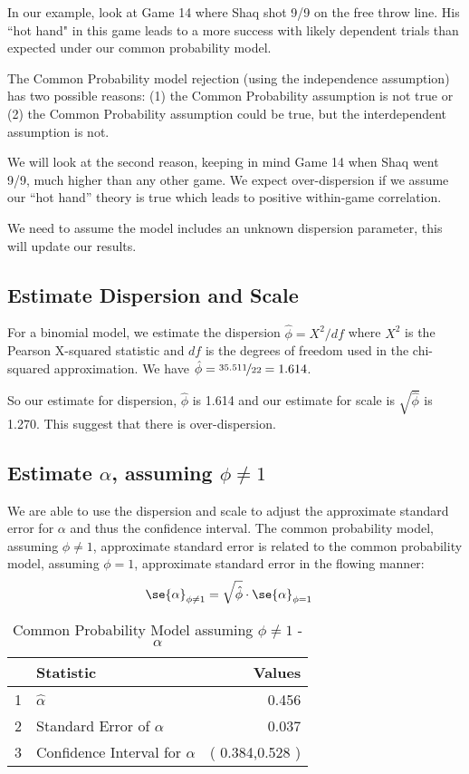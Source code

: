 \documentclass[12pt, letterpaper]{article}
\begin{document}
In our example, look at Game 14 where Shaq shot 9/9 on the free throw line.  His ``hot hand" in this game leads to a more success  with likely dependent trials than expected under our common probability model.  

The Common Probability model rejection (using the independence assumption) has two possible reasons: (1) the Common Probability assumption is not true or (2) the Common Probability assumption could be true, but the interdependent assumption is not. 

We will look at the second reason, keeping in mind Game 14 when Shaq went 9/9, much higher than any other game.  We expect over-dispersion if we assume our ``hot hand'' theory is true which leads to positive within-game correlation.  

We need to assume the model includes an unknown dispersion parameter, this will update our results.    

\subsection{Estimate Dispersion and Scale} 
For a binomial model, we estimate the dispersion $\hat{\phi} = X^2 / df$ where $X^2$ is the Pearson X-squared statistic  and $df$ is the degrees of freedom used in the chi-squared approximation.  We have $\hat{\phi} = \nicefrac{35.511}{22} = 1.614$.  

So our estimate for dispersion, $\hat{\phi}$ is 1.614 and our estimate for scale is $\sqrt{ \hat{\phi}}$ is 1.270.  This suggest that there is over-dispersion.  


\subsection{Estimate $\alpha$, assuming $\phi \neq 1$} 

We are able to use the dispersion and scale to adjust the approximate standard error for $\alpha$ and thus the confidence interval.  The common probability model, assuming $\phi \neq 1$,  approximate standard error is related to the common probability model, assuming $\phi =1$, approximate standard error in the flowing manner:  
\begin{align*}
\se{\alpha}_{\phi \neq 1}  & = \sqrt{\hat{\phi}} \cdot \se{\alpha}_{\phi = 1} 
\end{align*}


\begin{table}[ht]
	\centering
	\caption{Common Probability Model assuming $\phi \neq 1$ - $\alpha$} 
	\begin{tabular}{llr}
		\hline
		& Statistic & Values \\ 
		\hline
		1 & $\hat{\alpha}$ & 0.456 \\ 
		2 & Standard Error of $\alpha$ & 0.037 \\ 
		3 & Confidence Interval for $\alpha$ & ( 0.384,0.528 ) \\ 
		\hline
	\end{tabular}
\end{table}
\end{document}
